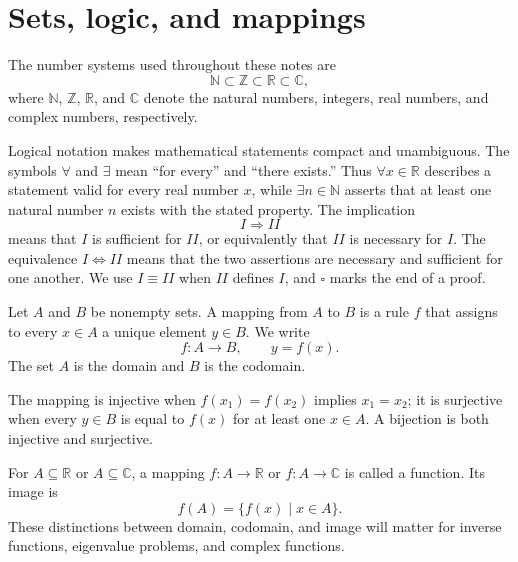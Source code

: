\section{Sets, logic, and mappings}

The number systems used throughout these notes are
\begin{equation}
\mathbb{N}\subset\mathbb{Z}\subset\mathbb{R}\subset\mathbb{C},
\end{equation}
where $\mathbb{N}$, $\mathbb{Z}$, $\mathbb{R}$, and $\mathbb{C}$ denote the natural numbers, integers, real numbers, and complex numbers, respectively.

Logical notation makes mathematical statements compact and unambiguous. The symbols $\forall$ and $\exists$ mean ``for every'' and ``there exists.'' Thus $\forall x\in\mathbb{R}$ describes a statement valid for every real number $x$, while $\exists n\in\mathbb{N}$ asserts that at least one natural number $n$ exists with the stated property. The implication
\begin{equation}
I\Rightarrow II
\end{equation}
means that $I$ is sufficient for $II$, or equivalently that $II$ is necessary for $I$. The equivalence $I\Leftrightarrow II$ means that the two assertions are necessary and sufficient for one another. We use $I\equiv II$ when $II$ defines $I$, and $\square$ marks the end of a proof.

\begin{definition}[Mapping]
Let $A$ and $B$ be nonempty sets. A mapping from $A$ to $B$ is a rule $f$ that assigns to every $x\in A$ a unique element $y\in B$. We write
\begin{equation}
f:A\to B,\qquad y=f(x).
\end{equation}
The set $A$ is the domain and $B$ is the codomain.
\end{definition}

The mapping is injective when $f(x_1)=f(x_2)$ implies $x_1=x_2$; it is surjective when every $y\in B$ is equal to $f(x)$ for at least one $x\in A$. A bijection is both injective and surjective.

For $A\subseteq\mathbb{R}$ or $A\subseteq\mathbb{C}$, a mapping $f:A\to\mathbb{R}$ or $f:A\to\mathbb{C}$ is called a function. Its image is
\begin{equation}
f(A)=\{f(x)\mid x\in A\}.
\end{equation}
These distinctions between domain, codomain, and image will matter for inverse functions, eigenvalue problems, and complex functions.
